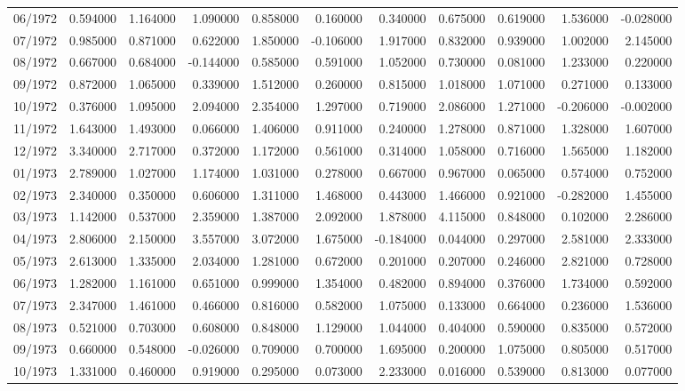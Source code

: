 \begin{tabular}{lrrrrrrrrrr}
06/1972 & 0.594000 & 1.164000 & 1.090000 & 0.858000 & 0.160000 & 0.340000 & 0.675000 & 0.619000 & 1.536000 & -0.028000 \\
07/1972 & 0.985000 & 0.871000 & 0.622000 & 1.850000 & -0.106000 & 1.917000 & 0.832000 & 0.939000 & 1.002000 & 2.145000 \\
08/1972 & 0.667000 & 0.684000 & -0.144000 & 0.585000 & 0.591000 & 1.052000 & 0.730000 & 0.081000 & 1.233000 & 0.220000 \\
09/1972 & 0.872000 & 1.065000 & 0.339000 & 1.512000 & 0.260000 & 0.815000 & 1.018000 & 1.071000 & 0.271000 & 0.133000 \\
10/1972 & 0.376000 & 1.095000 & 2.094000 & 2.354000 & 1.297000 & 0.719000 & 2.086000 & 1.271000 & -0.206000 & -0.002000 \\
11/1972 & 1.643000 & 1.493000 & 0.066000 & 1.406000 & 0.911000 & 0.240000 & 1.278000 & 0.871000 & 1.328000 & 1.607000 \\
12/1972 & 3.340000 & 2.717000 & 0.372000 & 1.172000 & 0.561000 & 0.314000 & 1.058000 & 0.716000 & 1.565000 & 1.182000 \\
01/1973 & 2.789000 & 1.027000 & 1.174000 & 1.031000 & 0.278000 & 0.667000 & 0.967000 & 0.065000 & 0.574000 & 0.752000 \\
02/1973 & 2.340000 & 0.350000 & 0.606000 & 1.311000 & 1.468000 & 0.443000 & 1.466000 & 0.921000 & -0.282000 & 1.455000 \\
03/1973 & 1.142000 & 0.537000 & 2.359000 & 1.387000 & 2.092000 & 1.878000 & 4.115000 & 0.848000 & 0.102000 & 2.286000 \\
04/1973 & 2.806000 & 2.150000 & 3.557000 & 3.072000 & 1.675000 & -0.184000 & 0.044000 & 0.297000 & 2.581000 & 2.333000 \\
05/1973 & 2.613000 & 1.335000 & 2.034000 & 1.281000 & 0.672000 & 0.201000 & 0.207000 & 0.246000 & 2.821000 & 0.728000 \\
06/1973 & 1.282000 & 1.161000 & 0.651000 & 0.999000 & 1.354000 & 0.482000 & 0.894000 & 0.376000 & 1.734000 & 0.592000 \\
07/1973 & 2.347000 & 1.461000 & 0.466000 & 0.816000 & 0.582000 & 1.075000 & 0.133000 & 0.664000 & 0.236000 & 1.536000 \\
08/1973 & 0.521000 & 0.703000 & 0.608000 & 0.848000 & 1.129000 & 1.044000 & 0.404000 & 0.590000 & 0.835000 & 0.572000 \\
09/1973 & 0.660000 & 0.548000 & -0.026000 & 0.709000 & 0.700000 & 1.695000 & 0.200000 & 1.075000 & 0.805000 & 0.517000 \\
10/1973 & 1.331000 & 0.460000 & 0.919000 & 0.295000 & 0.073000 & 2.233000 & 0.016000 & 0.539000 & 0.813000 & 0.077000 \\

\end{tabular}
